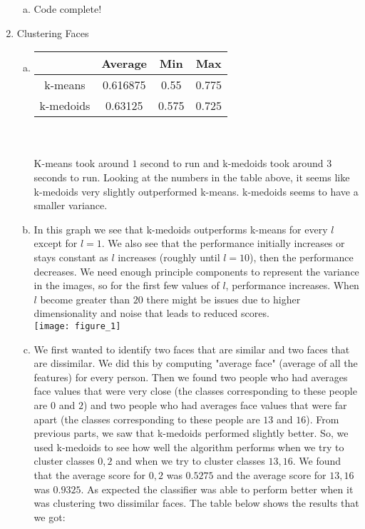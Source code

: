 \documentclass[11pt]{article}
\begin{document}
\begin{enumerate}[1]
\begin{enumerate}[(a)]
\item Code complete!
\end{enumerate}
\item Clustering Faces
\begin{enumerate}[(a)]
\item \begin{tabular}{| c | c | c | c |}
  \hline		
   & Average & Min & Max \\
  \hline
  k-means & 0.616875 & 0.55 & 0.775 \\
  k-medoids & 0.63125 & 0.575 & 0.725   \\
  \hline
\end{tabular}\\ \\
K-means took around $1$ second to run and k-medoids took around $3$ seconds to run. Looking at the numbers in the table above, it seems like k-medoids very slightly outperformed k-means. k-medoids seems to have a smaller variance. 
\item In this graph we see that k-medoids outperforms k-means for every $l$ except for $l=1$. We also see that the performance initially increases or stays constant as $l$ increases (roughly until $l=10$), then the performance decreases. We need enough principle components to represent the variance in the images, so for the first few values of $l$, performance increases. When $l$ become greater than $20$ there might be issues due to higher dimensionality and noise that leads to reduced scores.  \\
\texttt{[image: figure\_1]}
\item We first wanted to identify two faces that are similar and two faces that are dissimilar. We did this by computing "average face" (average of all the features) for every person. Then we found two people who had averages face values that were very close (the classes corresponding to these people are $0$ and $2$) and two people who had averages face values that were far apart (the classes corresponding to these people are $13$ and $16$). From previous parts, we saw that k-medoids performed slightly better. So, we used k-medoids to see how well the algorithm performs when we try to cluster classes $0,2$ and when we try to cluster classes $13,16$. We found that the average score for $0,2$ was $0.5275$ and the average score for $13, 16$ was $0.9325$. As expected the classifier was able to perform better when it was clustering two dissimilar faces.  The table below shows the results that we got: \\ \\

\end{enumerate}
\end{enumerate}
\end{document}
